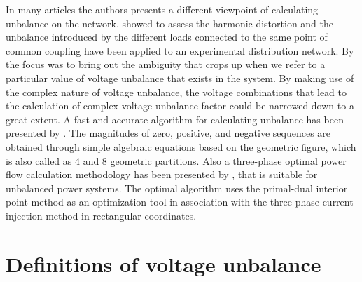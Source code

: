 In many articles the authors presents a different viewpoint of calculating unbalance on the network. \cite{martin2015unbalance} showed to assess the harmonic distortion and the unbalance introduced by the different loads connected to the same point of common coupling have been applied to an experimental distribution network.  By \cite{kini2007novel} the focus was to bring out the ambiguity that crops up when we refer to a particular value of voltage unbalance that exists in the system. By making use of the complex nature of voltage unbalance, the voltage combinations that lead to the calculation of complex voltage unbalance factor could be narrowed down to a great extent. A fast and accurate algorithm for calculating unbalance has been presented by \cite{wen2014approximate}. The magnitudes of zero, positive, and negative sequences are obtained through simple algebraic equations based on the geometric figure, which is also called as 4 and 8 geometric partitions. Also a three-phase optimal power flow calculation methodology has been presented by \cite{araujo2013three}, that is suitable for unbalanced power systems. The optimal algorithm uses the primal-dual interior point method as an optimization tool in association with the three-phase current injection method in rectangular coordinates.\\

\section{Definitions of voltage unbalance}\label{BASICUNB:sec:DefinitionsofUNB}

